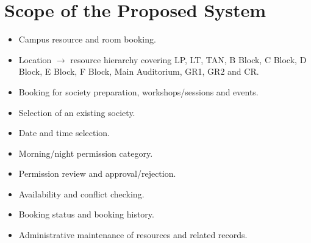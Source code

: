 \documentclass[12pt]{article}
\begin{document}
\section{Scope of the Proposed System}
\begin{itemize}
    \item Campus resource and room booking.
    \item Location $\rightarrow$ resource hierarchy covering LP, LT, TAN, B Block, C Block, D Block, E Block, F Block, Main Auditorium, GR1, GR2 and CR.
    \item Booking for society preparation, workshops/sessions and events.
    \item Selection of an existing society.
    \item Date and time selection.
    \item Morning/night permission category.
    \item Permission review and approval/rejection.
    \item Availability and conflict checking.
    \item Booking status and booking history.
    \item Administrative maintenance of resources and related records.
\end{itemize}
\end{document}
